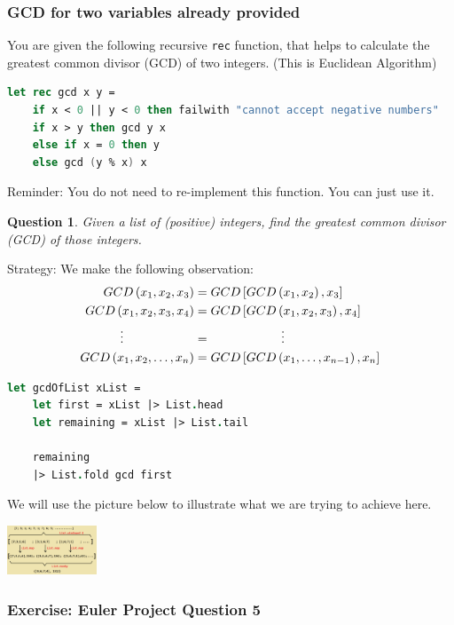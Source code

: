 \documentclass[12pt]{article}
\newtheorem*{question*}{Question}
\begin{document}
\subsubsection*{GCD for two variables already provided}
You are given the following recursive \texttt{rec} function, that helps to calculate the greatest common divisor (GCD) of two integers. (This is Euclidean Algorithm)
\begin{lstlisting}[language=FSharp]
let rec gcd x y =
    if x < 0 || y < 0 then failwith "cannot accept negative numbers"
    if x > y then gcd y x
    else if x = 0 then y
    else gcd (y % x) x
\end{lstlisting}
Reminder: You do not need to re-implement this function. You can just use it.
\begin{question*}
Given a list of (positive) integers, find the greatest common divisor (GCD) of those integers.
\end{question*}
Strategy: We make the following observation:
\begin{align*}
GCD\left(x_1, x_2, x_3\right) &= GCD\left[GCD\left(x_1, x_2\right), x_3\right]
\\GCD\left(x_1, x_2, x_3, x_4\right) &= GCD\left[GCD\left(x_1, x_2, x_3\right), x_4\right]
\\ \vdots \hspace{2.0cm}&= \hspace{2.0cm} \vdots
\\GCD\left(x_1, x_2, \ldots, x_n\right) &= GCD\left[GCD\left(x_1, \ldots, x_{n-1}\right), x_n\right]
\end{align*}
\begin{lstlisting}[language=FSharp]
let gcdOfList xList =
    let first = xList |> List.head
    let remaining = xList |> List.tail

    remaining
    |> List.fold gcd first
\end{lstlisting}
We will use the picture below to illustrate what we are trying to achieve here.
\begin{center}
\includegraphics[width=0.2\textwidth]{pictures/picture35.png}
\end{center}

\pagebreak

\subsubsection*{Exercise: Euler Project Question 5}
\end{document}
